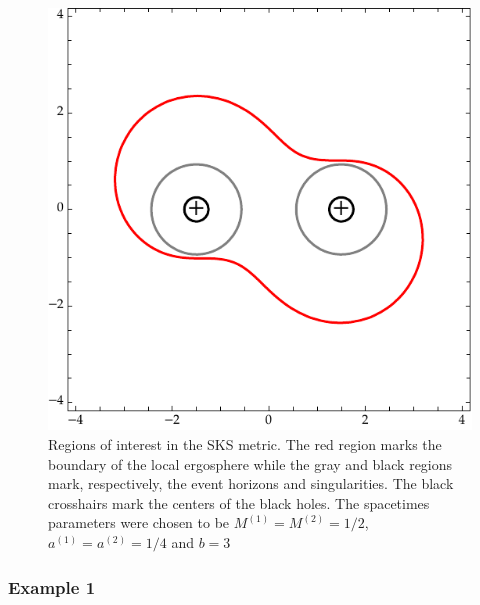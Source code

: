 \begin{figure}[!ht]
  \centering
  \includegraphics[width=\linewidth]{img/penrose_binaries/sks_regions.pdf}
  \caption{Regions of interest in the SKS metric. The red region marks the boundary of the local ergosphere while the gray and black regions mark, respectively, the event horizons and singularities. The black crosshairs mark the centers of the black holes. The spacetimes parameters were chosen to be $M^{(1)} = M^{(2)} = 1/2$, $a^{(1)} = a^{(2)} = 1/4$ and $b = 3$}
  \label{fig:sks_ergo_plot}
\end{figure}

\subsubsection{Example 1}
\label{ch:sks_example_1}

